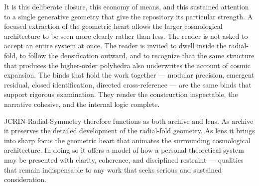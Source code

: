 It is this deliberate closure, this economy of means, and this sustained attention to a single generative geometry that give the repository its particular strength. A focused extraction of the geometric heart allows the larger cosmological architecture to be seen more clearly rather than less. The reader is not asked to accept an entire system at once. The reader is invited to dwell inside the radial-fold, to follow the densification outward, and to recognize that the same structure that produces the higher-order polyhedra also underwrites the account of cosmic expansion. The binds that hold the work together — modular precision, emergent residual, closed identification, directed cross-reference — are the same binds that support rigorous examination. They render the construction inspectable, the narrative cohesive, and the internal logic complete.

JCRIN-Radial-Symmetry therefore functions as both archive and lens. As archive it preserves the detailed development of the radial-fold geometry. As lens it brings into sharp focus the geometric heart that animates the surrounding cosmological architecture. In doing so it offers a model of how a personal theoretical system may be presented with clarity, coherence, and disciplined restraint — qualities that remain indispensable to any work that seeks serious and sustained consideration.
